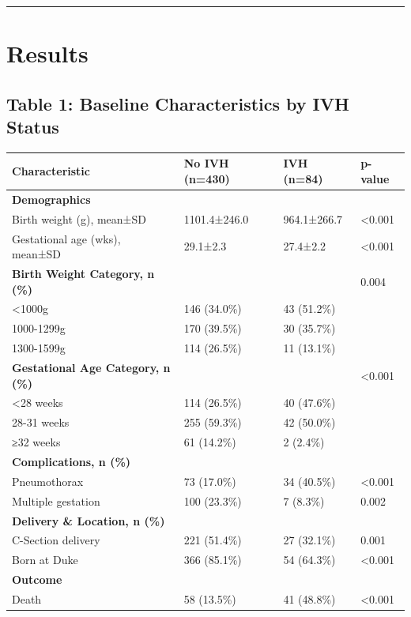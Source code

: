 \documentclass[
]{article}
\begin{document}
\begin{center}\rule{0.5\linewidth}{0.5pt}\end{center}

\hypertarget{results}{%
\section{Results}\label{results}}

\hypertarget{table-1-baseline-characteristics-by-ivh-status}{%
\subsection{Table 1: Baseline Characteristics by IVH
Status}\label{table-1-baseline-characteristics-by-ivh-status}}

\begin{longtable}[]{@{}llll@{}}
\toprule
Characteristic & No IVH (n=430) & IVH (n=84) & p-value \\
\midrule
\endhead
\textbf{Demographics} & & & \\
Birth weight (g), mean±SD & 1101.4±246.0 & 964.1±266.7 &
\textless0.001 \\
Gestational age (wks), mean±SD & 29.1±2.3 & 27.4±2.2 & \textless0.001 \\
\textbf{Birth Weight Category, n (\%)} & & & 0.004 \\
\textless1000g & 146 (34.0\%) & 43 (51.2\%) & \\
1000-1299g & 170 (39.5\%) & 30 (35.7\%) & \\
1300-1599g & 114 (26.5\%) & 11 (13.1\%) & \\
\textbf{Gestational Age Category, n (\%)} & & & \textless0.001 \\
\textless28 weeks & 114 (26.5\%) & 40 (47.6\%) & \\
28-31 weeks & 255 (59.3\%) & 42 (50.0\%) & \\
≥32 weeks & 61 (14.2\%) & 2 (2.4\%) & \\
\textbf{Complications, n (\%)} & & & \\
Pneumothorax & 73 (17.0\%) & 34 (40.5\%) & \textless0.001 \\
Multiple gestation & 100 (23.3\%) & 7 (8.3\%) & 0.002 \\
\textbf{Delivery \& Location, n (\%)} & & & \\
C-Section delivery & 221 (51.4\%) & 27 (32.1\%) & 0.001 \\
Born at Duke & 366 (85.1\%) & 54 (64.3\%) & \textless0.001 \\
\textbf{Outcome} & & & \\
Death & 58 (13.5\%) & 41 (48.8\%) & \textless0.001 \\
\bottomrule
\end{longtable}
\end{document}
